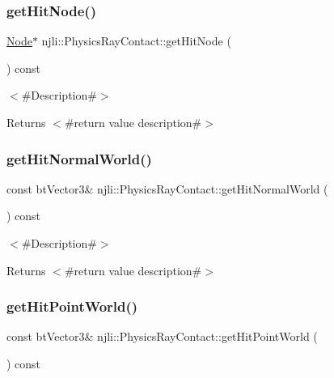 \subsubsection{\texorpdfstring{get\+Hit\+Node()}{getHitNode()}}
{\footnotesize\ttfamily \mbox{\hyperlink{classnjli_1_1_node}{Node}}$\ast$ njli\+::\+Physics\+Ray\+Contact\+::get\+Hit\+Node (\begin{DoxyParamCaption}{ }\end{DoxyParamCaption}) const}

$<$\#\+Description\#$>$

\begin{DoxyReturn}{Returns}
$<$\#return value description\#$>$ 
\end{DoxyReturn}
\mbox{\label{classnjli_1_1_physics_ray_contact_a69ed826971b15e1dac145fe0f220663d}} 
\subsubsection{\texorpdfstring{get\+Hit\+Normal\+World()}{getHitNormalWorld()}}
{\footnotesize\ttfamily const bt\+Vector3\& njli\+::\+Physics\+Ray\+Contact\+::get\+Hit\+Normal\+World (\begin{DoxyParamCaption}{ }\end{DoxyParamCaption}) const}

$<$\#\+Description\#$>$

\begin{DoxyReturn}{Returns}
$<$\#return value description\#$>$ 
\end{DoxyReturn}
\mbox{\label{classnjli_1_1_physics_ray_contact_ae4a0bc9a07a0a504fecd776424ee89f9}} 
\subsubsection{\texorpdfstring{get\+Hit\+Point\+World()}{getHitPointWorld()}}
{\footnotesize\ttfamily const bt\+Vector3\& njli\+::\+Physics\+Ray\+Contact\+::get\+Hit\+Point\+World (\begin{DoxyParamCaption}{ }\end{DoxyParamCaption}) const}

